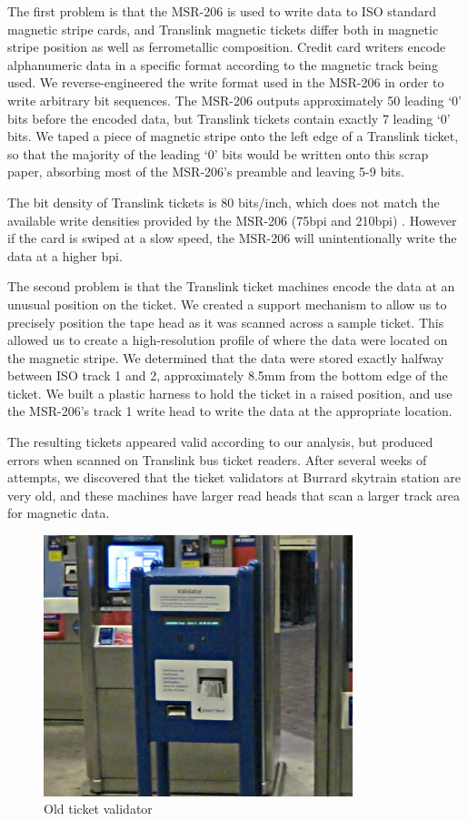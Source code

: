 \documentclass[fontsize=12pt]{scrartcl}
\begin{document}
The first problem is that the MSR-206 is used to write data to ISO standard magnetic stripe cards, and Translink magnetic tickets differ both in magnetic stripe position as well as ferrometallic composition. Credit card writers encode alphanumeric data in a specific format according to the magnetic track being used. We  reverse-engineered the write format used in the MSR-206 in order to write arbitrary bit sequences. The MSR-206 outputs approximately 50 leading `0' bits before the encoded data, but Translink tickets contain exactly 7 leading `0' bits. We taped a piece of magnetic stripe onto the left edge of a Translink ticket, so that the majority of the leading `0' bits would be written onto this scrap paper, absorbing most of the MSR-206's preamble and leaving  5-9 bits.

The bit density of Translink tickets is 80 bits/inch, which does not match the available write densities provided by the MSR-206 (75bpi and 210bpi) \cite{tyner}. However if the card is swiped at a slow speed, the MSR-206 will unintentionally write the data at a higher bpi.

The second problem is that the Translink ticket machines encode the data at an unusual position on the ticket. We created a support mechanism to allow us to precisely position the tape head as it was scanned across a sample ticket. This allowed us to create a high-resolution profile of where the data were located on the magnetic stripe. We determined that the data were stored exactly halfway between ISO track 1 and 2, approximately 8.5mm from the bottom edge of the ticket. We built a plastic harness to hold the ticket in a raised position, and use the MSR-206's track 1 write head to write the data at the appropriate location.

The resulting tickets appeared valid according to our analysis, but produced errors when scanned on Translink bus ticket readers. After several weeks of attempts, we discovered that the ticket validators at Burrard skytrain station are very old, and these machines have larger read heads that scan a larger track area for magnetic data.

\begin{figure}[ht!]
\centering
\includegraphics[width=90mm]{tv5tvm.jpg}
\caption{Old ticket validator}
\end{figure}
\end{document}
